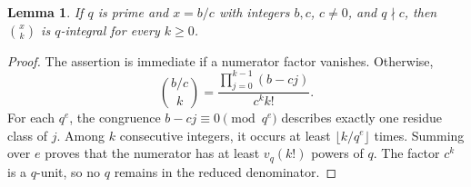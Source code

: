 \documentclass[11pt,a4paper]{article}
\numberwithin{equation}{section}
\newtheorem{lemma}[theorem]{Lemma}
\theoremstyle{definition}
\theoremstyle{remark}
\begin{document}
\begin{lemma}\label{lem:qbinomial}
If $q$ is prime and $x=b/c$ with integers $b,c$, $c\neq0$, and $q\nmid c$, then $\binom{x}{k}$ is $q$-integral for every $k\geq0$.
\end{lemma}
\begin{proof}
The assertion is immediate if a numerator factor vanishes. Otherwise,
\[
 \binom{b/c}{k}=\frac{\prod_{j=0}^{k-1}(b-cj)}{c^k k!}.
\]
For each $q^e$, the congruence $b-cj\equiv0\pmod{q^e}$ describes exactly one residue class of $j$. Among $k$ consecutive integers, it occurs at least $\lfloor k/q^e\rfloor$ times. Summing over $e$ proves that the numerator has at least $v_q(k!)$ powers of $q$. The factor $c^k$ is a $q$-unit, so no $q$ remains in the reduced denominator.
\end{proof}
\end{document}
